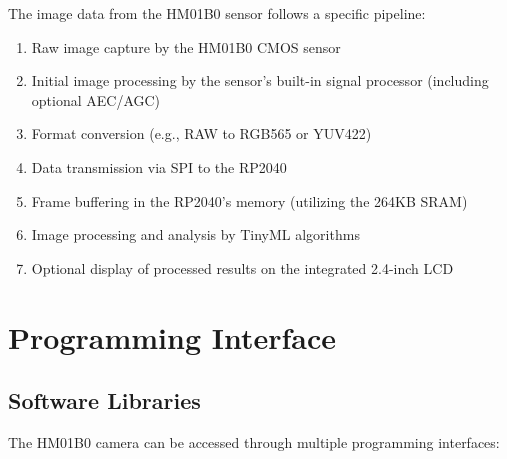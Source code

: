The image data from the HM01B0 sensor follows a specific pipeline:



\begin{enumerate}
    
    
    
    \item Raw image capture by the HM01B0 CMOS sensor
    
    
    
    \item Initial image processing by the sensor's built-in signal processor (including optional AEC/AGC)
    
    
    
    \item Format conversion (e.g., RAW to RGB565 or YUV422)
    
    
    
    \item Data transmission via SPI to the RP2040
    
    
    
    \item Frame buffering in the RP2040's memory (utilizing the 264KB SRAM)
    
    
    
    \item Image processing and analysis by TinyML algorithms
    
    
    
    \item Optional display of processed results on the integrated 2.4-inch LCD
    
    
    
\end{enumerate}







\section{Programming Interface}



\subsection{Software Libraries}



The HM01B0 camera can be accessed through multiple programming interfaces:




